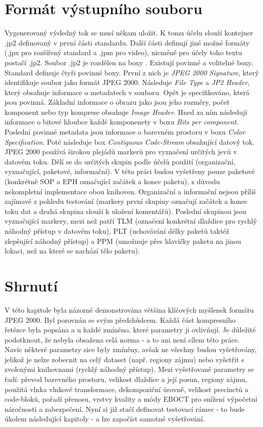 \section{Formát výstupního souboru}
Vygenerovaný výsledný tok se musí někam uložit. K tomu účelu slouží kontejner .jp2 definovaný v první části standardu. Další části definují jiné možné formáty (.jpx pro rozšířený standard a .jpm pro video), nicméně pro účely toho textu postačí .jp2.
Soubor .jp2 je rozdělen na boxy \cite{format}. Existují povinné a volitelné boxy. Standard definuje čtyři povinné boxy. První z nich je \textit{JPEG 2000 Signature}, který identifikuje soubor jako formát JPEG 2000. Následuje \textit{File Type} a \textit{JP2 Header}, který obsahuje informace o metadatech v souboru. Opět je specifikováno, která jsou povinná. Základní informace o obrazu jako jsou jeho rozměry, počet komponent nebo typ komprese obsahuje \textit{Image Header}. Hned za ním následují informace o bitové hloubce každé komponenety v boxu \textit{Bits per component}. Poslední povinné metadata jsou informace o barevném prostoru v boxu \textit{Color Specification}. Poté následuje box \textit{Contiguous Code-Stream} obsahující datový tok.\\
JPEG 2000 používá širokou plejádů markerů pro vyznačení určitých jevů v datovém toku. Dělí se do určitých skupin podle účelů použití (organizační, vyznačující, paketové, informační). V této práci budou vyšetřeny pouze paketové (konkrétně SOP a EPH označující začátek a konec paketu), z důvodu nekompletní implementace obou knihoven. Organizační a informační nejsou příliš zajímavé z pohledu testování (markery první skupiny označují začátek a konec toku dat a druhá skupina slouží k uložení komentářů). Poslední skupinou jsou vyznačující markery, mezi než patří TLM (označení konkrétní dlaždice pro rychlý náhodný přístup v datovém toku), PLT (uchovávání délky paketů taktéž zlepšující náhodný přístup) a PPM (umožnuje přes hlavičky paketu  na jinou lokaci, než na které se nachází tělo paketu).

\section{Shrnutí}
V této kapitole byla názorně demonstrována většina klíčových myšlenek formátu JPEG 2000. Byl porovnán se svým předchůdcem. Každá část kompresního řetězce byla popsána a u každé zmíněno, které parametry ji ovlivňují. Je důležité podotknout, že nebyla obsažena celá norma - a to ani není cílem této práce. Navíc některé parametry sice byly zmíněny, avšak ne všechny budou vyšetřovány, jelikož je nelze zobecnit na celý dataset (např. regiony zájmu) nebo vyšetřit s zvolenými knihovnami (rychlý náhodný přístup). Mezi vyšetřované parametry se řadí: převod barevného prostoru, velikost dlaždice a její posun, regiony zájmu, použitá vlnka vlnkové transformace, dekompoziční úrovně, velikost precinctů a code-bloků, pořadí přenosu, vrstvy kvality a módy EBOCT pro snížení výpočetní náročnosti a zabezpečení. Nyní si již stačí definovat testovací rámec - to bude úkolem následující kapitoly - a lze započíst samotné vyšetřování. 


